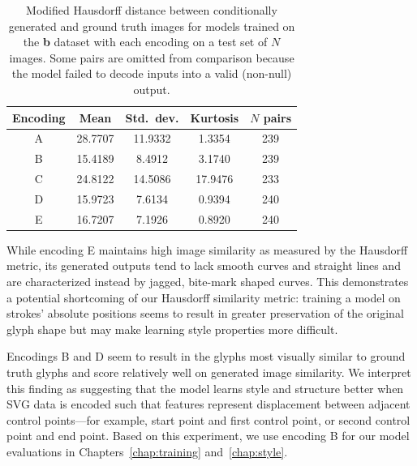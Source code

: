 \begin{table}[t]
\centering
\caption[Quantitative results for evaluating feature encodings]
    {Modified Hausdorff distance between conditionally generated and ground truth images for models trained on the \textbf{b} dataset with each encoding on a test set of $N$ images.
    Some pairs are omitted from comparison because the model failed to decode inputs into a valid (non-null) output.\label{tbl:encoding-results}}
\begin{tabular}{c c c c c}
\toprule
    Encoding & Mean & Std.\ dev. & Kurtosis & $N$ pairs \\ \midrule
    A & 28.7707 & 11.9332 & 1.3354 & 239 \\
    B & 15.4189 & 8.4912 & 3.1740 & 239 \\
    C & 24.8122 & 14.5086 & 17.9476 & 233 \\
    D & 15.9723 & 7.6134 & 0.9394 & 240 \\
    E & 16.7207 & 7.1926 & 0.8920 & 240 \\
\end{tabular}
\end{table}

While encoding E maintains high image similarity as measured by the Hausdorff metric, its generated outputs tend to lack smooth curves and straight lines and are characterized instead by jagged, bite-mark shaped curves.
This demonstrates a potential shortcoming of our Hausdorff similarity metric: training a model on strokes' absolute positions seems to result in greater preservation of the original glyph shape but may make learning style properties more difficult.

Encodings B and D seem to result in the glyphs most visually similar to ground truth glyphs and score relatively well on generated image similarity.
We interpret this finding as suggesting that the model learns style and structure better when SVG data is encoded such that features represent displacement between adjacent control points---for example, start point and first control point, or second control point and end point.
Based on this experiment, we use encoding B for our model evaluations in Chapters~\ref{chap:training} and~\ref{chap:style}.

